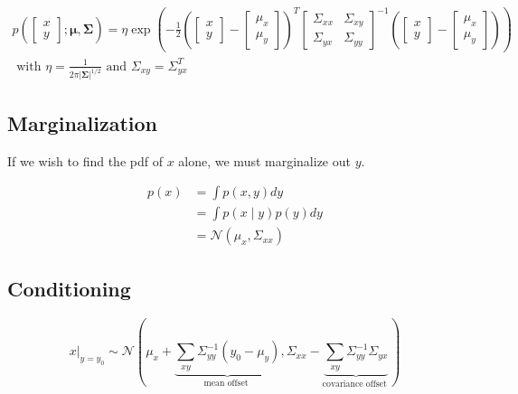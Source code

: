 \documentclass[12pt,a4paper]{article}
\begin{document}
$$
\begin{aligned}
p\left(\left[\begin{array}{c}
x \\
y
\end{array}\right] ; \boldsymbol{\mu}, \boldsymbol{\Sigma}\right)=\eta \exp \left(-\frac{1}{2}\left(\left[\begin{array}{c}
x \\
y
\end{array}\right]-\left[\begin{array}{c}
\mu_{x} \\
\mu_{y}
\end{array}\right]\right)^{T}\left[\begin{array}{cc}
\Sigma_{x x} & \Sigma_{x y} \\
\Sigma_{y x} & \Sigma_{y y}
\end{array}\right]^{-1}\left(\left[\begin{array}{c}
x \\
y
\end{array}\right]-\left[\begin{array}{c}
\mu_{x} \\
\mu_{y}
\end{array}\right]\right)\right) \\
\text { with } \eta=\frac{1}{2 \pi|\boldsymbol{\Sigma}|^{1 / 2}} \text { and } \Sigma_{x y}=\Sigma_{y x}^{T}
\end{aligned}
$$

\subsection{Marginalization}

If we wish to find the pdf of $x$ alone, we must marginalize out $y$.

$$
\begin{aligned}
p(x) &=\int p(x, y) d y \\
&=\int p(x \mid y) p(y) d y \\
&=\mathcal{N}\left(\mu_{x}, \Sigma_{x x}\right)
\end{aligned}
$$

\subsection{Conditioning}

$$
\left.x\right|_{y=y_{0}} \sim \mathcal{N}(\mu_{x}+\underbrace{\sum_{x y} \Sigma_{y y}^{-1}\left(y_{0}-\mu_{y}\right)}_{\text {mean offset }}, \Sigma_{x x}-\underbrace{\sum_{x y} \Sigma_{y y}^{-1} \Sigma_{y x}}_{\text {covariance offset }})
$$
\end{document}

